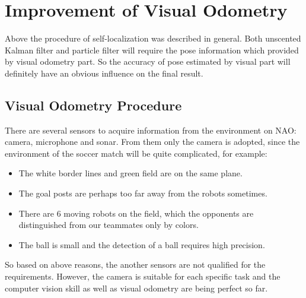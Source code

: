 \chapter{Improvement of Visual Odometry}\label{Chap:Imp}
Above the procedure of self-localization was described in general. Both unscented Kalman filter and particle filter will require the pose information which provided by visual odometry part. So the accuracy of pose estimated by visual part will definitely have an obvious influence on the final result.
\clearpage
\section{Visual Odometry Procedure}
There are several sensors to acquire information from the environment on NAO: camera, microphone and sonar. From them only the camera is adopted, since the environment of the soccer match will be quite complicated, for example:
\begin{itemize}
    \item The white border lines and green field are on the same plane.
    \item The goal posts are perhaps too far away from the robots sometimes.
    \item There are 6 moving robots on the field, which the opponents are distinguished from our teammates only by colors.
    \item The ball is small and the detection of a ball requires high precision.
\end{itemize}
So based on above reasons, the another sensors are not qualified for the requirements. However, the camera is suitable for each specific task and the computer vision skill as well as visual odometry are being perfect so far.


